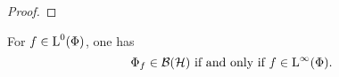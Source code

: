 \begin{proof}
% 
\end{proof}

\begin{lem} \label{maintheorem5}
  For $f \in {\text{L}^0}(\Phi)$, one has
\[
\Phi_f \in \mathcal{B}(\mathcal{H}) \text{ if and only if }f \in {\text{L}^\infty }(\Phi).
\]

 
\end{lem}

